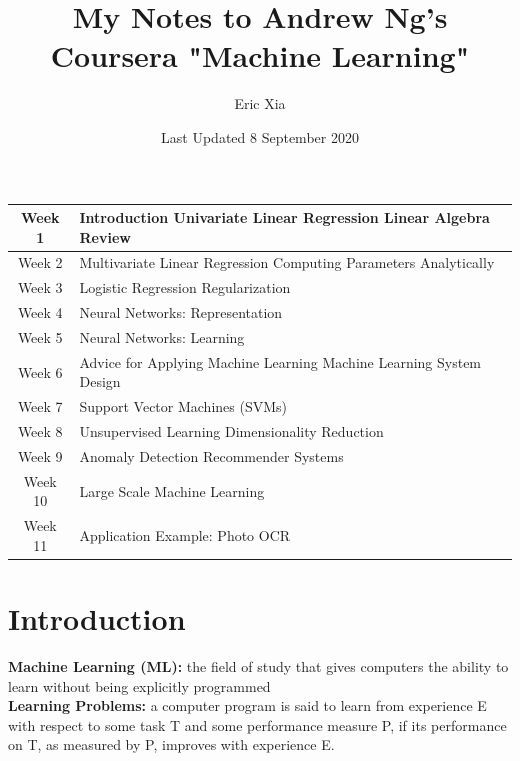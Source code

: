 \documentclass{article}
\title{My Notes to Andrew Ng's Coursera "Machine Learning"}
\author{Eric Xia}
\date{Last Updated 8 September 2020}
\begin{document}
    \maketitle
    \tableofcontents

    \begin{center}
        \begin{tabular}{|c|p{60mm}|}
            \hline
            Week 1 & Introduction \newline Univariate Linear Regression \newline Linear Algebra Review \\
            \hline
            Week 2 & Multivariate Linear Regression \newline Computing Parameters Analytically \\
            \hline
            Week 3 & Logistic Regression \newline Regularization \\
            \hline
            Week 4 & Neural Networks: Representation \\
            \hline
            Week 5 & Neural Networks: Learning \\
            \hline
            Week 6 & Advice for Applying Machine Learning \newline Machine Learning System Design \\
            \hline
            Week 7 & Support Vector Machines (SVMs) \\
            \hline
            Week 8 & Unsupervised Learning \newline Dimensionality Reduction \\
            \hline
            Week 9 & Anomaly Detection \newline Recommender Systems \\
            \hline
            Week 10 & Large Scale Machine Learning \\
            \hline
            Week 11 & Application Example: Photo OCR \\
            \hline
        \end{tabular}
    \end{center}

    \pagebreak

    \section{Introduction}
        \noindent \textbf{Machine Learning (ML):} the field of study that gives computers the ability to learn
        without being explicitly programmed \\
        \noindent \textbf{Learning Problems:} a computer program is said to learn from experience E with respect to some
        task T and some performance measure P, if its performance on T, as measured by P, improves with
        experience E. \\
\end{document}
